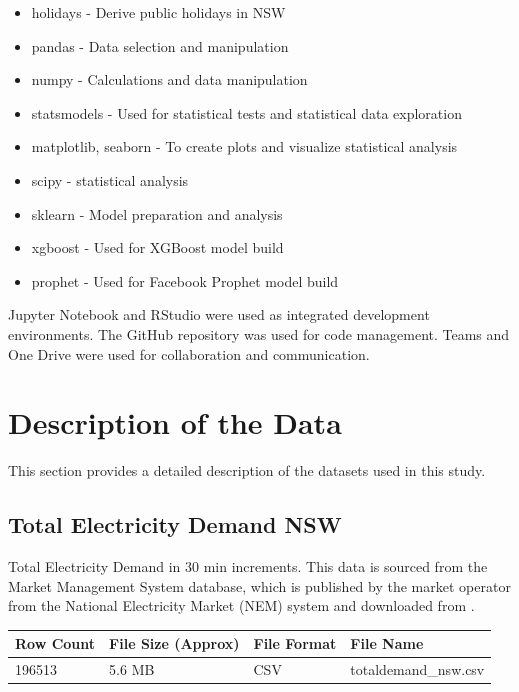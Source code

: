 \documentclass[mstat,12pt]{unswthesis}
\begin{document}
\begin{itemize}
  \item holidays - Derive public holidays in NSW 
  \item pandas - Data selection and manipulation
  \item numpy - Calculations and data manipulation
  \item statsmodels - Used for statistical tests and statistical data exploration
  \item matplotlib, seaborn - To create plots and visualize statistical analysis
  \item scipy - statistical analysis
  \item sklearn - Model preparation and analysis
  \item xgboost - Used for XGBoost model build
  \item prophet - Used for Facebook Prophet model build
\end{itemize}

Jupyter Notebook and RStudio were used as integrated development
environments. The GitHub repository was used for code management. Teams
and One Drive were used for collaboration and communication.

\section{Description of the Data}\label{description-of-the-data}

This section provides a detailed description of the datasets used in
this study.

\subsection{Total Electricity Demand
NSW}\label{total-electricity-demand-nsw}

Total Electricity Demand in 30 min increments. This data is sourced from
the Market Management System database, which is published by the market
operator from the National Electricity Market (NEM) system and
downloaded from \cite{UNSW_project}.

\begin{table}[h]
\tiny
\begin{tabular}{@{}|l|l|l|l|@{}}
\toprule
\textbf{Row Count} & \textbf{File Size (Approx)} & \textbf{File Format} & \textbf{File Name}   \\ \midrule
196513             & 5.6 MB                      & CSV                  & totaldemand\_nsw.csv \\ \bottomrule
\end{tabular}
\end{table}
\end{document}
